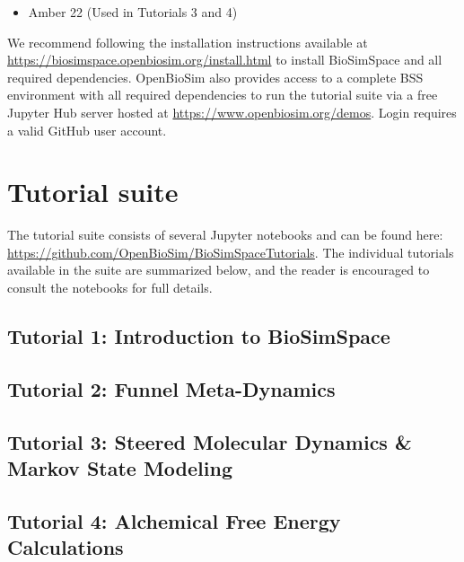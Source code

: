\documentclass[9pt,tutorial]{livecoms}
\begin{document}
\begin{itemize}
    \item Amber 22 (Used in Tutorials 3 and 4)
\end{itemize}

We recommend following the installation instructions available at \url{https://biosimspace.openbiosim.org/install.html} to install BioSimSpace and all required dependencies. 
OpenBioSim also provides access to a complete BSS environment with all required dependencies to run the tutorial suite via a free Jupyter Hub server hosted at \url{https://www.openbiosim.org/demos}. Login requires a valid GitHub user account. 

\section{Tutorial suite}

The tutorial suite consists of several Jupyter notebooks and can be found here: \url{https://github.com/OpenBioSim/BioSimSpaceTutorials}. The individual tutorials available in the suite are summarized below, and the reader is encouraged to consult the notebooks for full details.

\subsection{Tutorial 1: Introduction to BioSimSpace}


\subsection{Tutorial 2: Funnel Meta-Dynamics}


\subsection{Tutorial 3: Steered Molecular Dynamics \& Markov State Modeling}


\subsection{Tutorial 4: Alchemical Free Energy Calculations}

\end{document}
